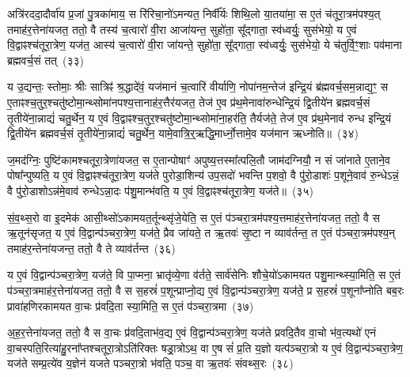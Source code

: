 {\anuvakamend[{लो॒कान्ग॑मयति॒ सावि॑द्वान्थ्सु॒शेवा॒ मावि॑श॒ यज॑मानं॒ द्वाद॑श च}]}%

अत्रि॑रददा॒दौर्वा॑य प्र॒जां पु॒त्रका॑माय॒ स रि॑रिचा॒नो॑\-ऽमन्यत॒ निर्वी᳚र्यः शिथि॒लो या॒तया॑मा॒ स ए॒तं च॑तूरा॒त्रम॑पश्य॒त् तमाह॑र॒त्तेना॑यजत॒ ततो॒ वै तस्य॑ च॒त्वारो॑ वी॒रा आजा॑यन्त॒ सुहो॑ता॒ सू᳚द्गाता॒ स्व॑ध्वर्युः॒ सुस॑भेयो॒ य ए॒वं वि॒द्वाꣴश्च॑तूरा॒त्रेण॒ यज॑त॒ आस्य॑ च॒त्वारो॑ वी॒रा जा॑यन्ते॒ सुहो॑ता॒ सू᳚द्गाता॒ स्व॑ध्वर्युः॒ सुस॑भेयो॒ ये च॑तुर्वि॒ꣳ॒शाः पव॑माना ब्रह्मवर्च॒सं तत्~(३३)

य उ॒द्यन्तः॒ स्तोमाः॒ श्रीः सात्रिꣴ॑ श्र॒द्धादे॑वं॒ यज॑मानं च॒त्वारि॑ वीर्याणि॒ नोपा॑नम॒न्तेज॑ इन्द्रि॒यं ब्र॑ह्मवर्च॒सम॒न्नाद्य॒ꣳ॒ स ए॒ताꣴश्च॒तुर॒श्चतु॑ष्टोमा॒न्थ्सोमा॑नपश्य॒त्तानाह॑र॒त्तैर॑यजत॒ तेज॑ ए॒व प्र॑थ॒मेनावा॑रुन्धेन्द्रि॒यं द्वि॒तीये॑न ब्रह्मवर्च॒सं तृ॒तीये॑ना॒न्नाद्यं॑ चतु॒र्थेन॒ य ए॒वं वि॒द्वाꣴश्च॒तुर॒श्चतु॑ष्टोमा॒न्थ्सोमा॑ना॒हर॑ति॒ तैर्यज॑ते॒ तेज॑ ए॒व प्र॑थ॒मेनाव॑ रुन्ध इन्द्रि॒यं द्वि॒तीये॑न ब्रह्मवर्च॒सं तृ॒तीये॑ना॒न्नाद्यं॑ चतु॒र्थेन॒ यामे॒वात्रि॒र्॒\mbox{}ऋद्धि॒मार्ध्नो॒त्तामे॒व यज॑मान ऋध्नोति॥~(३४)

{\anuvakamend[{तत्तेज॑ ए॒वाष्टाद॑श च}]}%

ज॒मद॑ग्निः॒ पुष्टि॑कामश्चतूरा॒त्रेणा॑यजत॒ स ए॒तान्पोषाꣳ॑ अपुष्य॒त्तस्मा᳚त्पलि॒तौ जाम॑दग्नियौ॒ न सं जा॑नाते ए॒ताने॒व पोषा᳚न्पुष्यति॒ य ए॒वं वि॒द्वाꣴश्च॑तूरा॒त्रेण॒ यज॑ते पुरोडा॒शिन्य॑ उप॒सदो॑ भवन्ति प॒शवो॒ वै पु॑रो॒डाशः॑ प॒शूने॒वाव॑ रु॒न्धे\-ऽन्नं॒ वै पु॑रो॒डाशो\-ऽन्न॑मे॒वाव॑ रुन्धे\-ऽन्ना॒दः प॑शु॒मान्भ॑वति॒ य ए॒वं वि॒द्वाꣴश्च॑तूरा॒त्रेण॒ यज॑ते॥~(३५)

{\anuvakamend[{ज॒मद॑ग्निर॒ष्टाच॑त्वारिꣳशत्}]}%

सं॒व॒थ्स॒रो वा इ॒दमेक॑ आसी॒थ्सो॑\-ऽकामयत॒र्तून्थ्सृ॑जे॒येति॒ स ए॒तं प॑ञ्चरा॒त्रम॑पश्य॒त्तमाह॑र॒त्तेना॑यजत॒ ततो॒ वै स ऋ॒तून॑सृजत॒ य ए॒वं वि॒द्वान्प॑ञ्चरा॒त्रेण॒ यज॑ते॒ प्रैव जा॑यते॒ त ऋ॒तवः॑ सृ॒ष्टा न व्याव॑र्तन्त॒ त ए॒तं प॑ञ्चरा॒त्रम॑पश्य॒न् तमाह॑र॒न्तेना॑यजन्त॒ ततो॒ वै ते व्याव॑र्तन्त~(३६)

य ए॒वं वि॒द्वान्प॑ञ्चरा॒त्रेण॒ यज॑ते॒ वि पा॒प्मना॒ भ्रातृ॑व्ये॒णा व॑र्तते॒ सार्व॑सेनिः शौचे॒यो॑\-ऽकामयत पशु॒मान्थ्स्या॒मिति॒ स ए॒तं प॑ञ्चरा॒त्रमाह॑र॒त्तेना॑यजत॒ ततो॒ वै स स॒हस्रं॑ प॒शून्प्राप्नो॒द्य ए॒वं वि॒द्वान्प॑ञ्चरा॒त्रेण॒ यज॑ते॒ प्र स॒हस्रं॑ प॒शूना᳚प्नोति बब॒रः प्रावा॑हणिरकामयत वा॒चः प्र॑वदि॒ता स्या॒मिति॒ स ए॒तं प॑ञ्चरा॒त्रमा~(३७)

अ॒ह॒र॒त्तेना॑यजत॒ ततो॒ वै स वा॒चः प्र॑वदि॒ताभ॑व॒द्य ए॒वं वि॒द्वान्प॑ञ्चरा॒त्रेण॒ यज॑ते प्रवदि॒तैव वा॒चो भ॑व॒त्यथो॑ एनं वा॒चस्पति॒रित्या॑हु॒रना᳚प्तश्चतूरा॒त्रो\-ऽति॑रिक्तः षड्रा॒त्रो\-ऽथ॒ वा ए॒ष सं॑ प्र॒ति य॒ज्ञो यत्प॑ञ्चरा॒त्रो य ए॒वं वि॒द्वान्प॑ञ्चरा॒त्रेण॒ यज॑ते सम्प्र॒त्ये॑व य॒ज्ञेन॑ यजते पञ्चरा॒त्रो भ॑वति॒ पञ्च॒ वा ऋ॒तवः॑ संवथ्स॒रः~(३८)


